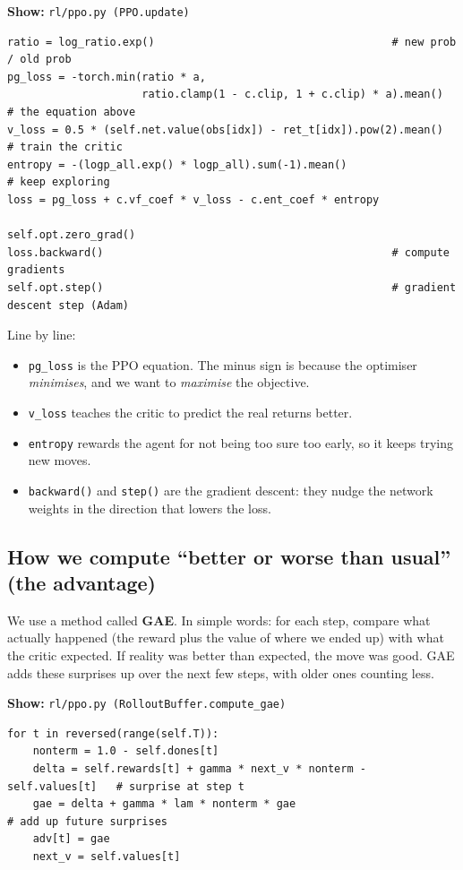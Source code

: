 \documentclass[11pt,a4paper]{article}
\newcommand{\code}[1]{\texttt{#1}}
\newcommand{\showfile}[1]{\par\noindent\textbf{Show:} \code{#1}\par}
\begin{document}
\showfile{rl/ppo.py  (PPO.update)}
\begin{lstlisting}
ratio = log_ratio.exp()                                     # new prob / old prob
pg_loss = -torch.min(ratio * a,
                     ratio.clamp(1 - c.clip, 1 + c.clip) * a).mean()   # the equation above
v_loss = 0.5 * (self.net.value(obs[idx]) - ret_t[idx]).pow(2).mean()   # train the critic
entropy = -(logp_all.exp() * logp_all).sum(-1).mean()                   # keep exploring
loss = pg_loss + c.vf_coef * v_loss - c.ent_coef * entropy

self.opt.zero_grad()
loss.backward()                                             # compute gradients
self.opt.step()                                             # gradient descent step (Adam)
\end{lstlisting}
Line by line:
\begin{itemize}
  \item \code{pg\_loss} is the PPO equation. The minus sign is because the optimiser
        \emph{minimises}, and we want to \emph{maximise} the objective.
  \item \code{v\_loss} teaches the critic to predict the real returns better.
  \item \code{entropy} rewards the agent for not being too sure too early, so it keeps
        trying new moves.
  \item \code{backward()} and \code{step()} are the gradient descent: they nudge the network
        weights in the direction that lowers the loss.
\end{itemize}

\subsection*{How we compute ``better or worse than usual'' (the advantage)}
We use a method called \textbf{GAE}. In simple words: for each step, compare what actually
happened (the reward plus the value of where we ended up) with what the critic expected. If
reality was better than expected, the move was good. GAE adds these surprises up over the next
few steps, with older ones counting less.

\showfile{rl/ppo.py  (RolloutBuffer.compute\_gae)}
\begin{lstlisting}
for t in reversed(range(self.T)):
    nonterm = 1.0 - self.dones[t]
    delta = self.rewards[t] + gamma * next_v * nonterm - self.values[t]   # surprise at step t
    gae = delta + gamma * lam * nonterm * gae                             # add up future surprises
    adv[t] = gae
    next_v = self.values[t]
\end{lstlisting}
\end{document}
